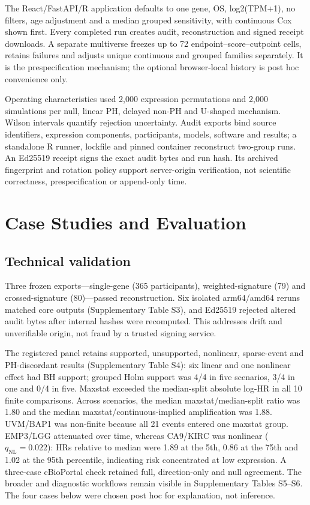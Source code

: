 \documentclass[12pt]{article}
\begin{document}
The React/FastAPI/R application defaults to one gene, OS, log2(TPM+1), no
filters, age adjustment and a median grouped sensitivity, with continuous Cox
shown first. Every completed run creates audit, reconstruction and signed
receipt downloads. A separate multiverse freezes up to 72
endpoint--score--cutpoint cells, retains failures and adjusts unique continuous
and grouped families separately. It is the prespecification mechanism; the
optional browser-local history is post hoc convenience only.

Operating characteristics used 2,000 expression permutations and 2,000
simulations per null, linear PH, delayed non-PH and U-shaped mechanism.
Wilson intervals quantify rejection uncertainty. Audit exports bind source
identifiers, expression components, participants, models, software and results;
a standalone R runner, lockfile and pinned container reconstruct two-group
runs. An Ed25519 receipt signs the exact audit bytes and run hash. Its archived
fingerprint and rotation policy support server-origin verification, not
scientific correctness, prespecification or append-only time.

\section{Case Studies and Evaluation}

\subsection*{Technical validation}

Three frozen exports---single-gene (365 participants), weighted-signature (79)
and crossed-signature (80)---passed reconstruction. Six isolated arm64/amd64
reruns matched core outputs (Supplementary Table S3), and Ed25519 rejected
altered audit bytes after internal hashes were recomputed. This addresses drift
and unverifiable origin, not fraud by a trusted signing service.

The registered panel retains supported, unsupported, nonlinear, sparse-event and
PH-discordant results (Supplementary Table S4): six linear and one nonlinear
effect had BH support; grouped Holm support was 4/4 in five scenarios, 3/4 in
one and 0/4 in five. Maxstat exceeded the median-split absolute log-HR in all
10 finite comparisons. Across scenarios, the median maxstat/median-split ratio
was 1.80 and the median maxstat/continuous-implied amplification was 1.88.
UVM/BAP1 was non-finite because all 21 events entered one maxstat group.
EMP3/LGG attenuated over time, whereas
CA9/KIRC was nonlinear (\(q_{\mathrm{NL}}=0.022\)): HRs relative to median were
1.89 at the 5th, 0.86 at the 75th and 1.02 at the 95th percentile, indicating
risk concentrated at low expression. A three-case cBioPortal check
\citep{cbioportal2012} retained full, direction-only and null agreement. The
broader and diagnostic workflows remain visible in Supplementary Tables
S5--S6. The four cases below were chosen post hoc for explanation, not
inference.
\end{document}
